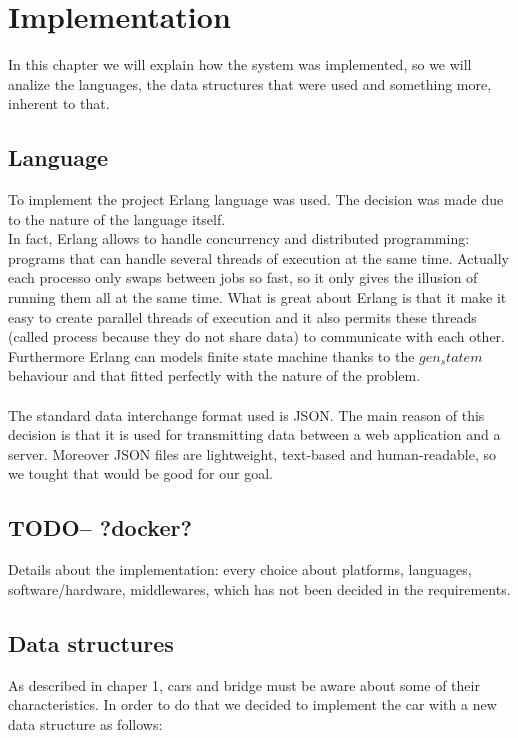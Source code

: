 \chapter{Implementation}\label{ch:implementation}
In this chapter we will explain how the system was implemented, so we will analize the languages, the data structures that were used
and something more, inherent to that.

\section{Language}
To implement the project Erlang language was used. The decision was made due to the nature of the language itself.\\
In fact, Erlang allows to handle concurrency and distributed programming: programs that can handle several threads of execution at the same time. 
Actually each processo only swaps between jobs so fast, so it only gives the illusion of running them all at the same time. 
What is great about Erlang is that it make it easy to create parallel threads of execution and it also permits these
threads (called process because they do not share data) to communicate with each other.\\
Furthermore Erlang can models finite state machine thanks to the $gen_statem$ behaviour and that fitted perfectly
with the nature of the problem.\\ \\
The standard data interchange format used is JSON. The main reason of this decision is that it is used 
for transmitting data between a web application and a server. 
Moreover JSON files are lightweight, text-based and human-readable, so we tought that would be good for our goal.

\section{TODO-- ?docker?}
Details about the implementation: every choice about platforms, languages, software/hardware, middlewares, which has not been decided in the requirements.

\section{Data structures}
As described in chaper 1, cars and bridge must be aware about some of their characteristics.
In order to do that we decided to implement the car with a new data structure as follows:

